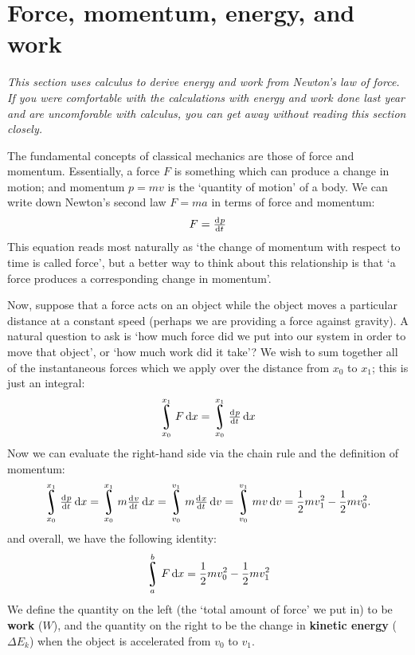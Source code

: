 \documentclass[a4paper]{amsbook}
\theoremstyle{definition}
\numberwithin{exercise}{chapter}
\numberwithin{exercise}{chapter}
\DeclareMathOperator*{\rint}{\scalerel*{\rotatebox{17}{$\!\int\!$}}{\int}}
\begin{document}
\section{Force, momentum, energy, and work}
\emph{This section uses calculus to derive energy and work from Newton's law of force. If you were comfortable with the
calculations with energy and work done last year and are uncomforable with calculus, you can get away without reading this
section closely.}

The fundamental concepts of classical mechanics are those of force and momentum. Essentially, a force $ F $ is something
which can produce a change in motion; and momentum $ p = mv $ is the `quantity of motion' of a body. We can write down Newton's
second law $ F = ma $ in terms of force and momentum:
\begin{equation}
  F = \od{p}{t}
\end{equation}
This equation reads most naturally as `the change of momentum with respect to time is called force', but a better way to think
about this relationship is that `a force produces a corresponding change in momentum'.

Now, suppose that a force acts on an object while the object moves a particular distance at a constant speed (perhaps we are
providing a force against gravity). A natural question to ask is `how much force did we put into our system in order to move
that object', or `how much work did it take'? We wish to sum together all of the instantaneous forces which we apply over the
distance from $ x_0 $ to $ x_1 $; this is just an integral:
\begin{displaymath}
  \rint_{x_0}^{x_1} F \dif{x} = \rint_{x_0}^{x_1} \od{p}{t} \dif{x}
\end{displaymath}
Now we can evaluate the right-hand side via the chain rule and the definition of momentum:
\begin{displaymath}
  \rint_{x_0}^{x_1} \od{p}{t} \dif{x} = \rint_{x_0}^{x_1} m \od{v}{t} \dif{x} = \rint_{v_0}^{v_1} m \od{x}{t} \dif{v}
    = \rint_{v_0}^{v_1} mv \dif{v} = \frac{1}{2}mv_1^2 - \frac{1}{2}mv_0^2.
\end{displaymath}
and overall, we have the following identity:
\begin{displaymath}
  \rint_a^b F \dif{x} = \frac{1}{2}mv_0^2 - \frac{1}{2}mv_1^2
\end{displaymath}
We define the quantity on the left (the `total amount of force' we put in) to be \textbf{work} ($ W $), and the quantity on
the right to be the change in \textbf{kinetic energy} ($ \Delta E_k $) when the object is accelerated from $ v_0 $ to $ v_1 $.
\end{document}

